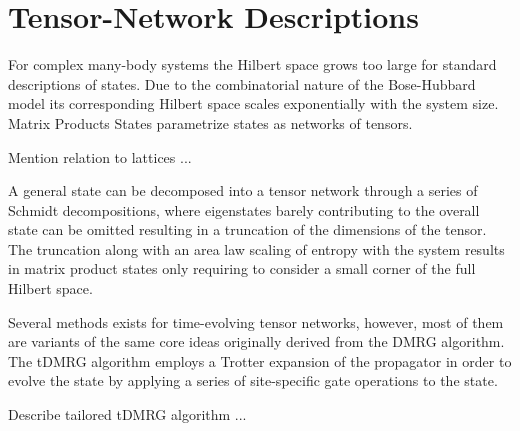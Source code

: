\section{Tensor-Network Descriptions}

For complex many-body systems the Hilbert space grows too large for standard descriptions of states. Due to the combinatorial nature of the Bose-Hubbard model its corresponding Hilbert space scales exponentially with the system size. Matrix Products States parametrize states as networks of tensors.

Mention relation to lattices ...

A general state can be decomposed into a tensor network through a series of Schmidt decompositions, where eigenstates barely contributing to the overall state can be omitted resulting in a truncation of the dimensions of the tensor. The truncation along with an area law scaling of entropy with the system results in matrix product states only requiring to consider a small corner of the full Hilbert space.

Several methods exists for time-evolving tensor networks, however, most of them are variants of the same core ideas originally derived from the DMRG algorithm. The tDMRG algorithm employs a Trotter expansion of the propagator in order to evolve the state by applying a series of site-specific gate operations to the state.

Describe tailored tDMRG algorithm ...